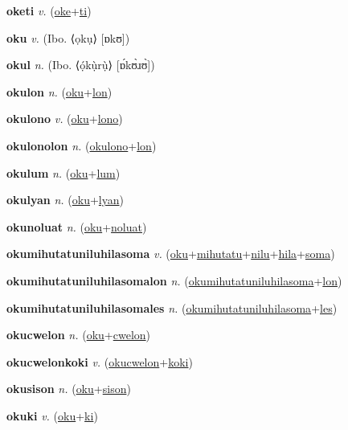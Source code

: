 \textbf{\hypertarget{oketi}{oketi}} \textit{v.} (\hyperlink{oke}{oke}+\allowbreak \hyperlink{ti}{ti})


\textbf{\hypertarget{oku}{oku}} \textit{v.} (Ibo. ⟨ọkụ⟩ [ɒkʊ])


\textbf{\hypertarget{okul}{okul}} \textit{n.} (Ibo. ⟨ọ́kụ̀rụ̀⟩ [ɒ́kʊ̀ɹʊ̀])


\textbf{\hypertarget{okulon}{okulon}} \textit{n.} (\hyperlink{oku}{oku}+\allowbreak \hyperlink{lon}{lon})


\textbf{\hypertarget{okulono}{okulono}} \textit{v.} (\hyperlink{oku}{oku}+\allowbreak \hyperlink{lono}{lono})


\textbf{\hypertarget{okulonolon}{okulonolon}} \textit{n.} (\hyperlink{okulono}{okulono}+\allowbreak \hyperlink{lon}{lon})


\textbf{\hypertarget{okulum}{okulum}} \textit{n.} (\hyperlink{oku}{oku}+\allowbreak \hyperlink{lum}{lum})


\textbf{\hypertarget{okulyan}{okulyan}} \textit{n.} (\hyperlink{oku}{oku}+\allowbreak \hyperlink{lyan}{lyan})


\textbf{\hypertarget{okunoluat}{okunoluat}} \textit{n.} (\hyperlink{oku}{oku}+\allowbreak \hyperlink{noluat}{noluat})


\textbf{\hypertarget{okumihutatuniluhilasoma}{okumihutatuniluhilasoma}} \textit{v.} (\hyperlink{oku}{oku}+\allowbreak \hyperlink{mihutatu}{mihutatu}+\allowbreak \hyperlink{nilu}{nilu}+\allowbreak \hyperlink{hila}{hila}+\allowbreak \hyperlink{soma}{soma})


\textbf{\hypertarget{okumihutatuniluhilasomalon}{okumihutatuniluhilasomalon}} \textit{n.} (\hyperlink{okumihutatuniluhilasoma}{okumihutatuniluhilasoma}+\allowbreak \hyperlink{lon}{lon})


\textbf{\hypertarget{okumihutatuniluhilasomales}{okumihutatuniluhilasomales}} \textit{n.} (\hyperlink{okumihutatuniluhilasoma}{okumihutatuniluhilasoma}+\allowbreak \hyperlink{les}{les})


\textbf{\hypertarget{okucwelon}{okucwelon}} \textit{n.} (\hyperlink{oku}{oku}+\allowbreak \hyperlink{cwelon}{cwelon})


\textbf{\hypertarget{okucwelonkoki}{okucwelonkoki}} \textit{v.} (\hyperlink{okucwelon}{okucwelon}+\allowbreak \hyperlink{koki}{koki})


\textbf{\hypertarget{okusison}{okusison}} \textit{n.} (\hyperlink{oku}{oku}+\allowbreak \hyperlink{sison}{sison})


\textbf{\hypertarget{okuki}{okuki}} \textit{v.} (\hyperlink{oku}{oku}+\allowbreak \hyperlink{ki}{ki})


